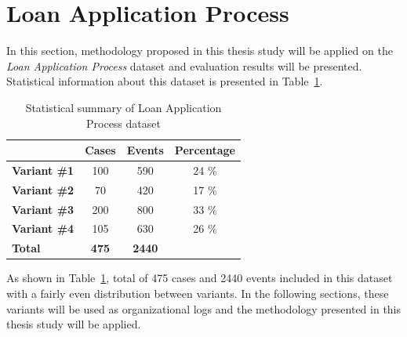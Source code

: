 \section{Loan Application Process}
\label{sec:loan-app-process}
In this section, methodology proposed in this thesis study will be applied on the \textit{Loan Application Process} dataset \cite{loan-app-data} and evaluation results will be presented. Statistical information about this dataset is presented in Table~\ref{table:loan-app-process-summary}.
\begin{table}[]
\centering
\caption{Statistical summary of Loan Application Process dataset}
\label{table:loan-app-process-summary}
\begin{tabular}{@{}lccc@{}}
\toprule
                  & {\bf Cases} & {\bf Events} & {\bf Percentage} \\ \midrule
{\bf Variant \#1} & 100         & 590          & 24 \%            \\ \midrule
{\bf Variant \#2} & 70          & 420          & 17 \%            \\ \midrule
{\bf Variant \#3} & 200         & 800          & 33 \%            \\ \midrule
{\bf Variant \#4} & 105         & 630          & 26 \%            \\ \midrule
{\bf Total}       & {\bf 475}   & {\bf 2440}   & {\bf }           \\ \bottomrule
\end{tabular}
\end{table}

As shown in Table~\ref{table:loan-app-process-summary}, total of 475 cases and 2440 events included in this dataset with a fairly even distribution between variants. In the following sections, these variants will be used as organizational logs and the methodology presented in this thesis study will be applied.


